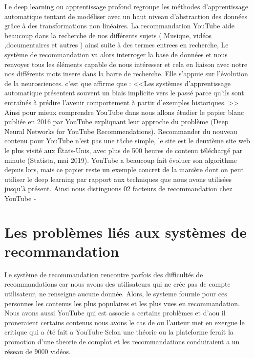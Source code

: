\documentclass[12pt,a4paper]{article}
\begin{document}
 Le deep learning ou apprentissage profond regroupe les méthodes d'apprentissage
automatique tentant de modéliser avec un haut niveau d'abstraction des données grâce à
des transformations non linéaires. La recommandation YouTube aide beaucoup dans la recherche de nos différents sujets ( Musique, vidéos ,documentaires et autres ) ainsi suite à des termes entrees en recherche, Le système de recommandation va alors interroger la base de données et nous renvoyer tous les éléments capable de nous intéresser et cela en liaison avec notre nos différents mots insere dans la barre de recherche. Elle s'appuie sur l'évolution de la neurosciences. c'est que \cite{covington2016deep} affirme que : <<Les systèmes d'apprentissage automatique présentent souvent un biais implicite vers le passé parce qu'ils sont entraînés à prédire l'avenir comportement à partir d'exemples historiques. >> Ainsi pour mieux comprendre YouTube dans nous allons étudier le papier blanc publiée en 2016 par YouTube expliquant leur approche du problème (Deep Neural Networks for YouTube
Recommendations). Recommander du nouveau contenu pour YouTube n'est pas une tâche
simple, le site est le deuxième site web le plus visité aux États-Unis, avec plus de 500 heures de contenu téléchargé par minute (Statista, mai 2019). YouTube a beaucoup fait
évoluer son algorithme depuis lors, mais ce papier reste un exemple concret de la manière dont on peut utiliser le deep learning par rapport aux techniques que nous avons utilisées jusqu'à présent. Ainsi nous distinguons 02 facteurs de recommandation chez YouTube 
-

\section{Les problèmes liés aux  systèmes de recommandation }
Le système de recommandation rencontre parfois des difficultés de recommandations car nous avons des utilisateurs qui ne crée pas de compte utilisateur, ne renseigne aucune donnée. Alors, le systeme fournie pour ces personnes les contenus les plus populaires et les plus vues en recommandation.  Nous avons aussi YouTube qui est associe a certains problèmes et d'aou il proneraient certains contenus nous avons le cas de \cite{tufekci2018youtube} ou l'auteur met en exergue le critique qui a été fait a YouTube Selon une théorie ou la plateforme ferait la promotion d'une theorie de complot et les recommandations conduiraient a un réseau de 9000 vidéos.
\end{document}
